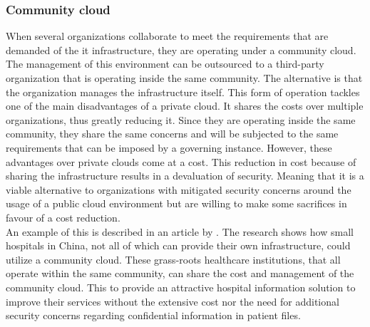 \subsubsection{Community cloud}
When several organizations collaborate to meet the requirements that are demanded of the \acrshort{it} infrastructure, they are operating under a community cloud. 
The management of this environment can be outsourced to a third-party organization that is operating inside the same community. The alternative is that the organization manages the infrastructure itself.
This form of operation tackles one of the main disadvantages of a private cloud. It shares the costs over multiple organizations, thus greatly reducing it. 
Since they are operating inside the same community, they share the same concerns and will be subjected to the same requirements that can be imposed by a governing instance. 
However, these advantages over private clouds come at a cost. 
This reduction in cost because of sharing the infrastructure results in a devaluation of security. 
Meaning that it is a viable alternative to organizations with mitigated security concerns around the usage of a public cloud environment but are willing to make some sacrifices in favour of a cost reduction. 
\\
An example of this is described in an article by \textcite{Yao2014}. 
The research shows how small hospitals in China, not all of which can provide their own infrastructure, could utilize a community cloud. 
These grass-roots healthcare institutions, that all operate within the same community, can share the cost and management of the community cloud. This to provide an attractive hospital information solution to improve their services without the extensive cost nor the need for additional security concerns regarding confidential information in patient files.

